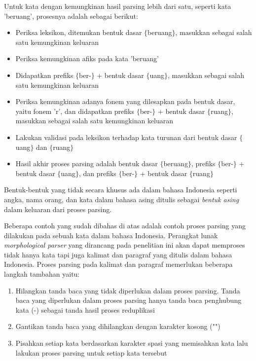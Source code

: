 
Untuk kata dengan kemungkinan hasil parsing lebih dari satu, seperti kata 'beruang', prosesnya adalah sebagai berikut:
\begin{itemize}
	\item Periksa leksikon, ditemukan bentuk dasar $\lbrace$beruang$\rbrace$, masukkan sebagai salah satu kemungkinan keluaran
	\item Periksa kemungkinan afiks pada kata 'beruang'
	\item Didapatkan prefiks $\lbrace$ber-$\rbrace$ + bentuk dasar $\lbrace$uang$\rbrace$, masukkan sebagai salah satu kemungkinan keluaran
	\item Periksa kemungkinan adanya fonem yang dilesapkan pada bentuk dasar, yaitu fonem 'r', dan didapatkan prefiks $\lbrace$ber-$\rbrace$ + bentuk dasar $\lbrace$ruang$\rbrace$, masukkan sebagai salah satu kemungkinan keluaran
	\item Lakukan validasi pada leksikon terhadap kata turunan dari bentuk dasar $\lbrace$uang$\rbrace$ dan $\lbrace$ruang$\rbrace$
	\item Hasil akhir proses parsing adalah bentuk dasar $\lbrace$beruang$\rbrace$, prefiks $\lbrace$ber-$\rbrace$ + bentuk dasar $\lbrace$uang$\rbrace$, dan prefiks $\lbrace$ber-$\rbrace$ + bentuk dasar $\lbrace$ruang$\rbrace$
\end{itemize}

Bentuk-bentuk yang tidak secara khusus ada dalam bahasa Indonesia seperti angka, nama orang, dan kata dalam bahasa asing ditulis sebagai \textit{bentuk asing} dalam keluaran dari proses parsing.

Beberapa contoh yang sudah dibahas di atas adalah contoh proses parsing yang dilakukan pada sebuah kata dalam bahasa Indonesia. Perangkat lunak \textit{morphological parser} yang dirancang pada penelitian ini akan dapat memproses tidak hanya kata tapi juga kalimat dan paragraf yang ditulis dalam bahasa Indonesia. Proses parsing pada kalimat dan paragraf memerlukan beberapa langkah tambahan yaitu:

\begin{enumerate}
	\item Hilangkan tanda baca yang tidak diperlukan dalam proses parsing. Tanda baca yang diperlukan dalam proses parsing hanya tanda baca penghubung kata (-) sebagai tanda hasil proses reduplikasi
	\item Gantikan tanda baca yang dihilangkan dengan karakter kosong ("")
	\item Pisahkan setiap kata berdasarkan karakter spasi yang memisahkan kata lalu lakukan proses parsing untuk setiap kata tersebut
\end{enumerate}


